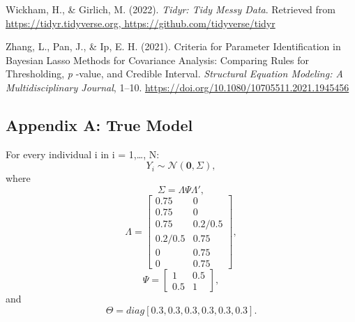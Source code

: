 \documentclass[
  man, donotrepeattitle,floatsintext]{apa6}
\newlength{\cslhangindent}
\newlength{\cslentryspacingunit} %
\newenvironment{CSLReferences}[2] %
 {%
  \setlength{\parindent}{0pt}
  \ifodd #1
  \let\oldpar\par
  \def\par{\hangindent=\cslhangindent\oldpar}
  \fi
  \setlength{\parskip}{#2\cslentryspacingunit}
 }%
 {}
\begin{document}
\begin{CSLReferences}{1}{0}
\leavevmode{}%
Wickham, H., \& Girlich, M. (2022). \emph{Tidyr: {Tidy} {Messy} {Data}}. Retrieved from \href{https://tidyr.tidyverse.org,\%20https://github.com/tidyverse/tidyr}{https://tidyr.tidyverse.org, https://github.com/tidyverse/tidyr}

\leavevmode{}%
Zhang, L., Pan, J., \& Ip, E. H. (2021). Criteria for {Parameter} {Identification} in {Bayesian} {Lasso} {Methods} for {Covariance} {Analysis}: {Comparing} {Rules} for {Thresholding}, \emph{p} -value, and {Credible} {Interval}. \emph{Structural Equation Modeling: A Multidisciplinary Journal}, 1--10. \url{https://doi.org/10.1080/10705511.2021.1945456}

\end{CSLReferences}

\endgroup

\newpage

\hypertarget{appendix-appendix}{%
\appendix}


\hypertarget{appendix-a-true-model}{%
\subsection{Appendix A: True Model}\label{appendix-a-true-model}}

For every individual i in i = 1,\ldots, N:
\[Y_i \sim \mathcal{N}(\mathbf{0}, \Sigma),\] where
\[\Sigma = \Lambda\Psi\Lambda',\]
\[\Lambda = 
    \begin{bmatrix}
    0.75 & 0 \\
    0.75 & 0 \\
    0.75 & 0.2/0.5 \\
    0.2/0.5 & 0.75 \\
    0 & 0.75 \\
    0 & 0.75
    \end{bmatrix},\]
\[\Psi =
    \begin{bmatrix}
     1 & 0.5 \\
     0.5 & 1
    \end{bmatrix}
,\] and
\[\Theta = diag[0.3, 0.3, 0.3, 0.3, 0.3, 0.3].\]
\end{document}
